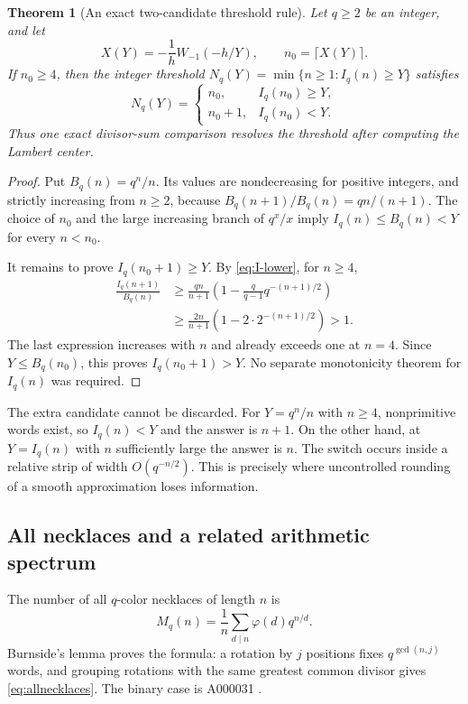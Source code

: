 \documentclass[11pt]{article}
\numberwithin{equation}{section}
\newtheorem{theorem}{Theorem}[section]
\theoremstyle{definition}
\begin{document}
\begin{theorem}[An exact two-candidate threshold rule]\label{thm:two-candidate}
Let $q\ge2$ be an integer, and let
\[
 X(Y)=-\frac1hW_{-1}(-h/Y),\qquad n_0=\lceil X(Y)\rceil.
\]
If $n_0\ge4$, then the integer threshold
$N_q(Y)=\min\{n\ge1:I_q(n)\ge Y\}$ satisfies
\begin{equation}\label{eq:two-candidate}
 \boxed{\displaystyle
 N_q(Y)=
 \begin{cases}
 n_0,&I_q(n_0)\ge Y,\\
 n_0+1,&I_q(n_0)<Y.
 \end{cases}}
\end{equation}
Thus one exact divisor-sum comparison resolves the threshold after computing the Lambert center.
\end{theorem}
\begin{proof}
Put $B_q(n)=q^n/n$. Its values are nondecreasing for positive integers, and strictly increasing from $n\ge2$, because
$B_q(n+1)/B_q(n)=qn/(n+1)$. The choice of $n_0$ and the large increasing branch of $q^x/x$ imply
$I_q(n)\le B_q(n)<Y$ for every $n<n_0$.

It remains to prove $I_q(n_0+1)\ge Y$. By \eqref{eq:I-lower}, for $n\ge4$,
\begin{align*}
 \frac{I_q(n+1)}{B_q(n)}
 &\ge\frac{qn}{n+1}
   \left(1-\frac q{q-1}q^{-(n+1)/2}\right)\\
 &\ge\frac{2n}{n+1}\left(1-2\cdot2^{-(n+1)/2}\right)>1.
\end{align*}
The last expression increases with $n$ and already exceeds one at $n=4$.
Since $Y\le B_q(n_0)$, this proves $I_q(n_0+1)>Y$. No separate monotonicity theorem for $I_q(n)$ was required.
\end{proof}

The extra candidate cannot be discarded. For $Y=q^n/n$ with $n\ge4$, nonprimitive words exist, so $I_q(n)<Y$ and the answer is $n+1$. On the other hand, at $Y=I_q(n)$ with $n$ sufficiently large the answer is $n$. The switch occurs inside a relative strip of width $O(q^{-n/2})$. This is precisely where uncontrolled rounding of a smooth approximation loses information.

\subsection{All necklaces and a related arithmetic spectrum}

The number of all $q$-color necklaces of length $n$ is
\begin{equation}\label{eq:allnecklaces}
 M_q(n)=\frac1n\sum_{d\mid n}\varphi(d)q^{n/d}.
\end{equation}
Burnside's lemma proves the formula: a rotation by $j$ positions fixes
$q^{\gcd(n,j)}$ words, and grouping rotations with the same greatest common divisor gives \eqref{eq:allnecklaces}. The binary case is A000031 \cite{oeisnecklaces}.
\end{document}
